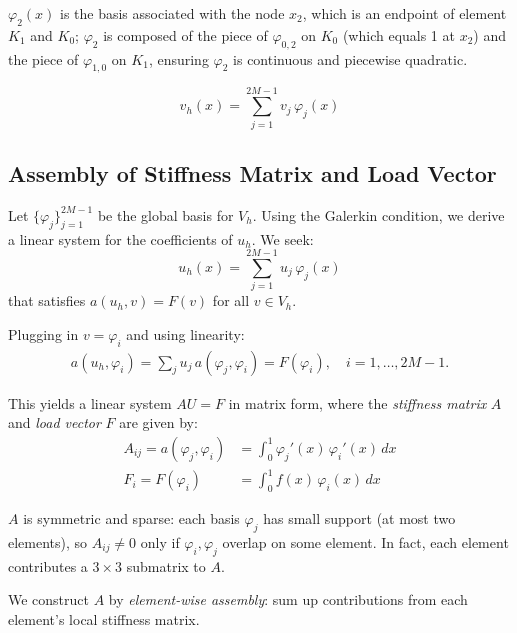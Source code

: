 \documentclass[a4paper,10pt]{article}
\begin{document}
\begin{example}{}{}
	\(\varphi_2(x)\) is the basis associated with the node \(x_2\), which is an endpoint of element \(K_1\) and \(K_0\);
	\(\varphi_2\) is composed of the piece of \(\varphi_{0,2}\) on \(K_0\) (which equals 1 at \(x_2\)) and the piece of \(\varphi_{1,0}\) on \(K_1\), ensuring \(\varphi_2\) is continuous and piecewise quadratic.
\end{example}

\[
	v_h(x) = \sum_{j =1}^{2M-1} v_j\, \varphi_j(x)
\]

\subsection*{Assembly of Stiffness Matrix and Load Vector}
Let \(\{ \varphi_j \}_{j=1}^{2M-1} \) be the global basis for \(V_h\).
Using the Galerkin condition, we derive a linear system for the coefficients of \(u_h\).
We seek:
\[
	u_h(x) = \sum_{j=1}^{2M-1} u_j\, \varphi_j(x)
\]
that satisfies \(a(u_h,v) = F(v)\) for all \(v \in V_h\).

Plugging in \(v = \varphi_i\) and using linearity:
\begin{align*}
	a(u_h,\varphi_i) = \sum_{j} u_j\, a(\varphi_j,\varphi_i) = F(\varphi_i), \quad i=1,\dots,2M-1.
\end{align*}

This yields a linear system \(AU = F\) in matrix form, where the \emph{stiffness matrix} \(A\) and \emph{load vector} \(F\) are given by:
\begin{align*}
	A_{ij}  = a(\varphi_j,\varphi_i) & = \int_0^1 \varphi_j'(x)\,\varphi_i'(x)\,dx \\
	F_i     = F(\varphi_i)           & = \int_0^1 f(x)\,\varphi_i(x)\,dx
\end{align*}

\(A\) is symmetric and sparse: each basis \(\varphi_j\) has small support (at most two elements), so \(A_{ij}\neq 0\) only if \(\varphi_i, \varphi_j\) overlap on some element.
In fact, each element contributes a \(3\times 3\) submatrix to \(A\).

We construct \(A\) by \emph{element-wise assembly}: sum up contributions from each element's local stiffness matrix.
\end{document}
